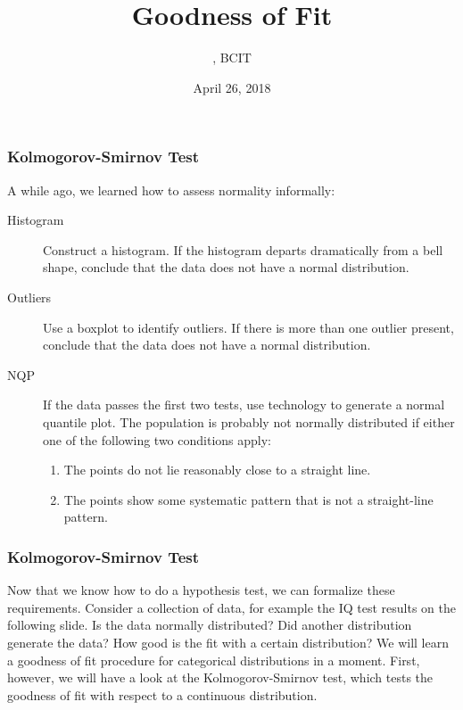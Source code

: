 \documentclass[xcolor=dvipsnames]{beamer}
\title{Goodness of Fit}
\subtitle{{\CourseNumber}, BCIT}
\author{\CourseName}
\date{April 26, 2018}
\begin{document}
\begin{frame}
  \titlepage
\end{frame}

\begin{frame}
  \frametitle{Kolmogorov-Smirnov Test}
  A while ago, we learned how to assess normality informally:
  \begin{description}
\item[Histogram] Construct a histogram. If the histogram departs
  dramatically from a bell shape, conclude that the data does not
  have a normal distribution.
\item[Outliers] Use a boxplot to identify outliers. If there is
  more than one outlier present, conclude that the data does not
  have a normal distribution.
\item[NQP] If the data passes the first two
  tests, use technology to generate a \alert{normal quantile
    plot}. The population is probably not normally distributed if
  either one of the following two conditions apply:
  \begin{enumerate}
  \item The points do not lie reasonably close to a straight line.
  \item The points show some systematic pattern that is not a
    straight-line pattern.
  \end{enumerate}
\end{description}
\end{frame}

\begin{frame}
  \frametitle{Kolmogorov-Smirnov Test}
  Now that we know how to do a hypothesis test, we can formalize these
  requirements. Consider a collection of data, for example the IQ test
  results on the following slide. Is the data normally distributed?
  Did another distribution generate the data? How good is the fit with
  a certain distribution? We will learn a goodness of fit procedure
  for \alert{categorical distributions} in a moment. First, however,
  we will have a look at the Kolmogorov-Smirnov test, which tests the
  goodness of fit with respect to a \alert{continuous distribution}.
\end{frame}
\end{document}
